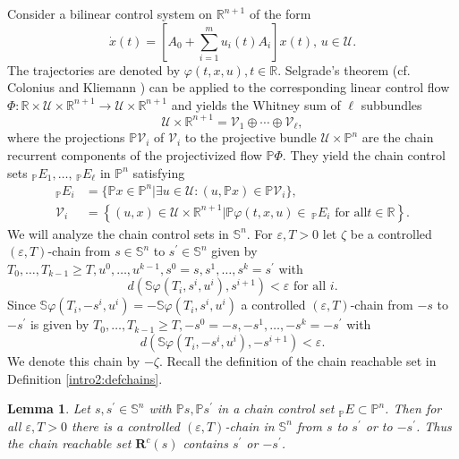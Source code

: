 \documentclass[preprint,12pt]{elsarticle}
\newtheorem{lemma}{Lemma}
\begin{document}
Consider a bilinear control system on $\mathbb{R}^{n+1}$ of the form%
\begin{equation}
\dot{x}(t)=\left[  A_{0}+\sum_{i=1}^{m}u_{i}(t)A_{i}\right]  x(t),\,u\in
\mathcal{U}. \label{bilinear}%
\end{equation}
The trajectories are denoted by $\varphi(t,x,u),t\in\mathbb{R}$. Selgrade's
theorem (cf. Colonius and Kliemann \cite[Theorem 7.1.2]{ColK00}) can be
applied to the corresponding linear control flow $\Phi:\mathbb{R}%
\times\mathcal{U}\times\mathbb{R}^{n+1}\rightarrow\mathcal{U}\times
\mathbb{R}^{n+1}$ and yields the Whitney sum of $\ell$ subbundles%
\[
\mathcal{U}\times\mathbb{R}^{n+1}=\mathcal{V}_{1}\oplus\cdots\oplus
\mathcal{V}_{\ell},
\]
where the projections $\mathbb{P}\mathcal{V}_{i}$ of $\mathcal{V}_{i}$ to the
projective bundle $\mathcal{U}\times\mathbb{P}^{n}$ are the chain recurrent
components of the projectivized flow $\mathbb{P}\Phi$. They yield the chain
control sets $_{\mathbb{P}}E_{1},\ldots,\,_{\mathbb{P}}E_{\ell}$ in
$\mathbb{P}^{n}$ satisfying%
\begin{align}
_{\mathbb{P}}E_{i}  &  =\{\mathbb{P}x\in\mathbb{P}^{n}\left\vert \exists
u\in\mathcal{U}:(u,\mathbb{P}x)\in\mathbb{P}\mathcal{V}_{i}\right.
\},\label{5.2}\\
\mathcal{V}_{i}  &  =\left\{  (u,x)\in\mathcal{U}\times\mathbb{R}%
^{n+1}\left\vert \mathbb{P}\varphi(t,x,u)\in\,_{\mathbb{P}}E_{i}\text{ for all
}t\in\mathbb{R}\right.  \right\}  . \label{5.3}%
\end{align}
We will analyze the chain control sets in $\mathbb{S}^{n}$. For $\varepsilon
,T>0$ let $\zeta$ be a controlled $(\varepsilon,T)$-chain from $s\in
\mathbb{S}^{n}$ to $s^{\prime}\in\mathbb{S}^{n}$ given by $T_{0}%
,\ldots,T_{k-1}\allowbreak\geq T,u^{0},\ldots,u^{k-1},s^{0}=s,s^{1}%
,\ldots,s^{k}=s^{\prime}$ with%
\[
d(\mathbb{S}\varphi(T_{i},s^{i},u^{i}),s^{i+1})<\varepsilon\text{ for all }i.
\]
Since $\mathbb{S}\varphi(T_{i},-s^{i},u^{i})=-\mathbb{S}\varphi(T_{i}%
,s^{i},u^{i})$ a controlled $(\varepsilon,T)$-chain from $-s$ to $-s^{\prime}$
is given by $T_{0},\ldots,T_{k-1}\geq T,-s^{0}=-s,-s^{1},\ldots,-s^{k}%
=-s^{\prime}$ with%
\[
d(\mathbb{S}\varphi(T_{i},-s^{i},u^{i}),-s^{i+1})<\varepsilon.
\]
We denote this chain by $-\zeta$. Recall the definition of the chain reachable
set in Definition \ref{intro2:defchains}.

\begin{lemma}
\label{Lemma_plus_minusS}Let $s,s^{\prime}\in\mathbb{S}^{n}$ with
$\mathbb{P}s,\mathbb{P}s^{\prime}$ in a chain control set $_{\mathbb{P}%
}E\subset\mathbb{P}^{n}$. Then for all $\varepsilon,T>0$ there is a controlled
$(\varepsilon,T)$-chain in $\mathbb{S}^{n}$ from $s$ to $s^{\prime}$ or to
$-s^{\prime}$. Thus the chain reachable set $\mathbf{R}^{c}(s)$ contains
$s^{\prime}$ or $-s^{\prime}$.
\end{lemma}
\end{document}
